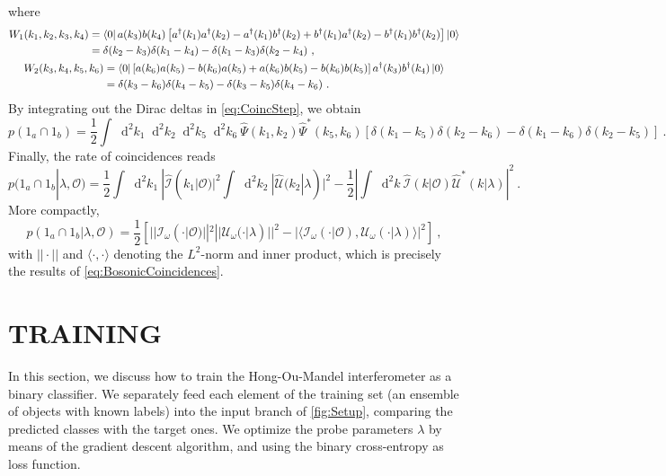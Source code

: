\documentclass[reprint,
superscriptaddress,
nofootinbib,
aps,
pra,
showkeys
]{revtex4-2}
\newcommand*\dif{\mathop{}\!\mathrm{d}}
\newcommand{\I}{\mathcal{I}}
\newcommand{\U}{\mathcal{U}}
\renewcommand{\O}{\mathcal{O}}
\begin{document}
\begin{widetext}
where
\begin{gather}
	\begin{split}
		W_1(k_1,k_2,k_3,k_4) &= \bra{0} a(k_3) b(k_4)\left[a^\dagger(k_1)a^\dagger(k_2) - a^\dagger(k_1)b^\dagger(k_2) + b^\dagger(k_1)a^\dagger(k_2) - b^\dagger(k_1)b^\dagger(k_2) \right] \ket{0} \\
	&= \delta(k_2 - k_3)\delta(k_1 - k_4) - \delta(k_1 - k_3)\delta(k_2 - k_4) \ , 
	\end{split} \\
	\begin{split}
		W_2(k_3,k_4,k_5,k_6) &= \bra{0} \left[a(k_6)a(k_5) - b(k_6)a(k_5) + a(k_6)b(k_5) - b(k_6)b(k_5) \right] a^\dagger(k_3) b^\dagger(k_4) \ket{0} \\
	&= \delta(k_3 - k_6)\delta(k_4 - k_5) - \delta(k_3 - k_5)\delta(k_4 - k_6) \ .
	\end{split}
\end{gather}
By integrating out the Dirac deltas in \cref{eq:CoincStep}, we obtain
\begin{equation}
	p(1_a \cap 1_b) = \frac{1}{2}\int \dif^2k_1 \dif^2k_2 \dif^2k_5 \dif^2k_6 \ \hat{\Psi}(k_1,k_2) \hat{\Psi}^*(k_5,k_6) \left[\delta(k_1 - k_5)\delta(k_2-k_6) - \delta(k_1 - k_6)\delta(k_2 - k_5) \right] \ .
\end{equation}
Finally, the rate of coincidences reads
\begin{equation}
	p(1_a \cap 1_b|\lambda, \O) = \frac{1}{2} \int \dif^2k_1 \ |\hat{\I}(k_1 | \O)|^2 \int \dif^2k_2 \ |\hat{\U}(k_2|\lambda)|^2 - \frac{1}{2} \left| \int \dif^2k \ \hat{\I}(k | \O) \hat{\U}^*(k|\lambda) \right|^2 \ .
\end{equation}
More compactly, 
\begin{equation}
	 p(1_a \cap 1_b|\lambda, \O) = \frac{1}{2}\left[|| \I_\omega(\cdot|\O) ||^2 || \U_\omega(\cdot|\lambda) ||^2 -  \left| \langle \I_\omega(\cdot|\O),\U_\omega (\cdot|\lambda) \rangle \right|^2 \right] \ ,
\end{equation}
with $|| \cdot ||$ and $\langle \cdot , \cdot \rangle$ denoting the $L^2$-norm and inner product, which is precisely the results of \cref{eq:BosonicCoincidences}.

\section{TRAINING\label{app:Training}}
In this section, we discuss how to train the Hong-Ou-Mandel interferometer as a binary classifier. We separately feed each element of the training set (an ensemble of objects with known labels) into the input branch of \cref{fig:Setup}, comparing the predicted classes with the target ones. We optimize the probe parameters $\lambda$ by means of the gradient descent algorithm, and using the binary cross-entropy as loss function.


\end{widetext}
\end{document}
